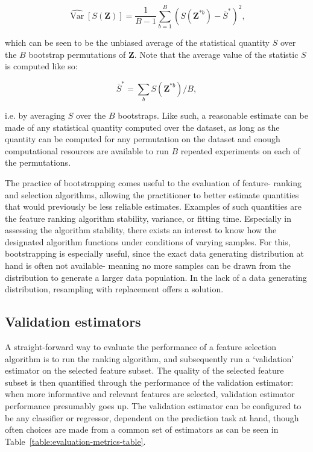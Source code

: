 \documentclass{article}
\begin{document}
\begin{equation}\label{eq:variance-bootstrap}
\widehat{\operatorname{Var}}[S(\mathbf{Z})]=\frac{1}{B-1} \sum_{b=1}^{B}\left(S\left(\mathbf{Z}^{* b}\right)-\bar{S}^{*}\right)^{2},
\end{equation}

which can be seen to be the unbiased average of the statistical quantity $S$ over the $B$ bootstrap permutations of $\mathbf{Z}$. Note that the average value of the statistic $S$ is computed like so:

\begin{equation}\label{eq:average-bootstrap}
\bar{S}^{*}=\sum_{b} S\left(\mathbf{Z}^{* b}\right) / B,
\end{equation}

i.e. by averaging $S$ over the $B$ bootstraps. Like such, a reasonable estimate can be made of any statistical quantity computed over the dataset, as long as the quantity can be computed for any permutation on the dataset and enough computational resources are available to run $B$ repeated experiments on each of the permutations.

The practice of bootstrapping comes useful to the evaluation of feature- ranking and selection algorithms, allowing the practitioner to better estimate quantities that would previously be less reliable estimates. Examples of such quantities are the feature ranking algorithm stability, variance, or fitting time. Especially in assessing the algorithm stability, there exists an interest to know how the designated algorithm functions under conditions of varying samples. For this, bootstrapping is especially useful, since the exact data generating distribution at hand is often not available- meaning no more samples can be drawn from the distribution to generate a larger data population. In the lack of a data generating distribution, resampling with replacement offers a solution.

\subsection{Validation estimators}\label{section:validation estimators}
A straight-forward way to evaluate the performance of a feature selection algorithm is to run the ranking algorithm, and subsequently run a `validation' estimator on the selected feature subset. The quality of the selected feature subset is then quantified through the performance of the validation estimator: when more informative and relevant features are selected, validation estimator performance presumably goes up. The validation estimator can be configured to be any classifier or regressor, dependent on the prediction task at hand, though often choices are made from a common set of estimators as can be seen in Table~\ref{table:evaluation-metrics-table}. 
\end{document}
